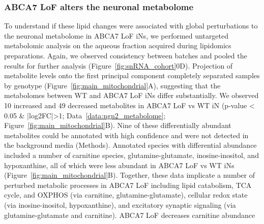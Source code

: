 \subsubsection{ABCA7 LoF alters the neuronal metabolome}
To understand if these lipid changes were associated with global perturbations to the neuronal metabolome in ABCA7 LoF iNs, we performed untargeted metabolomic analysis on the aqueous fraction acquired during lipidomics preparations. Again, we observed consistency between batches and pooled the results for further analysis (Figure~\ref{fig:snRNA_cohort}0D). Projection of metabolite levels onto the first principal component completely separated samples by genotype (Figure~\ref{fig:main_mitochondrial}A), suggesting that the metabolomes between WT and ABCA7 LoF iNs differ substantially. 
We observed 10 increased and 49 decreased metabolites in ABCA7 LoF vs WT iN (p-value < 0.05 & |log2FC|>1; Data~\ref{data:ngn2_metabolome}; Figure~\ref{fig:main_mitochondrial}B). Nine of these differentially abundant metabolites could be annotated with high confidence and were not detected in the background media (Methods). Annotated species with differential abundance included a number of carnitine species, glutamine-glutamate, inosine-inositol, and hypoxanthine, all of which were less abundant in ABCA7 LoF vs WT iNs (Figure~\ref{fig:main_mitochondrial}B). Together, these data implicate a number of perturbed metabolic processes in ABCA7 LoF including lipid catabolism, TCA cycle, and OXPHOS (via carnitine\cite{Virmani2022-uc}, glutamine-glutamate\cite{Yoo2020-lh,noauthor_2023-sp}), cellular redox state (via inosine-inositol\cite{Chatree2020-qn,Basile2022-dd}, hypoxanthine\cite{Furuhashi2020-oi,Lee2018-tk}), and excitatory synaptic signaling (via glutamine-glutamate\cite{Morland2022-dk,noauthor_2021-cn,noauthor_2022-jz} and carnitine\cite{Inazu2008-wg,noauthor_2016-gp,Janiri1991-sx}). 
ABCA7 LoF decreases carnitine abundance

